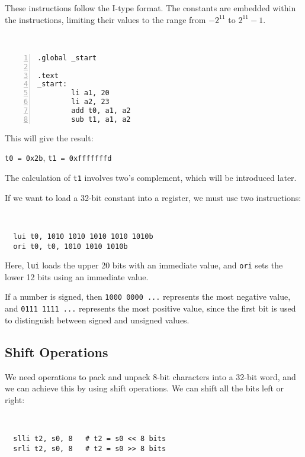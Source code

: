 These instructions follow the I-type format. The constants are embedded within the instructions, limiting their values to the range from \(-2^{11}\) to \(2^{11} - 1\). 

\begin{eg}~

\begin{minipage}{0.5\textwidth}
\begin{Verbatim}[numbers=left,xleftmargin=5mm]
.global _start

.text
_start:
        li a1, 20
        li a2, 23
        add t0, a1, a2
        sub t1, a1, a2
\end{Verbatim}
\end{minipage}
\begin{minipage}{0.5\textwidth}\color{red}
This will give the result: 

\verb|t0 = 0x2b|, \verb|t1 = 0xfffffffd|
\end{minipage}
\begin{note}
  The calculation of \verb|t1| involves two's complement, which will be introduced later.
\end{note}
\end{eg}

If we want to load a 32-bit constant into a register, we must use two instructions:
\begin{codeBlock}~
\begin{verbatim}
  lui t0, 1010 1010 1010 1010 1010b
  ori t0, t0, 1010 1010 1010b
\end{verbatim}
\end{codeBlock}

Here, \verb|lui| loads the upper 20 bits with an immediate value, and \verb|ori| sets the lower 12 bits using an immediate value.

If a number is signed, then \verb|1000 0000 ...| represents the most negative value, and \verb|0111 1111 ...| represents the most positive value, since the first bit is used to distinguish between signed and unsigned values.

\subsection{Shift Operations}
We need operations to pack and unpack 8-bit characters into a 32-bit word, and we can achieve this by using shift operations. We can shift all the bits left or right:
\begin{codeBlock}~
\begin{verbatim}
  slli t2, s0, 8   # t2 = s0 << 8 bits
  srli t2, s0, 8   # t2 = s0 >> 8 bits
\end{verbatim}
\end{codeBlock}

